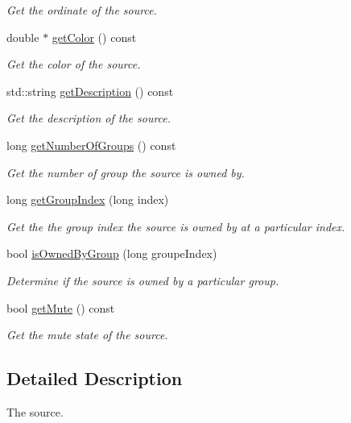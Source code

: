 \begin{DoxyCompactItemize}
\begin{DoxyCompactList}\small\item\em Get the ordinate of the source. \end{DoxyCompactList}\item 
double $\ast$ \hyperlink{class_hoa2_d_1_1_source_a4544d0ab2a4bc7c26e6b4597469321bf}{get\-Color} () const 
\begin{DoxyCompactList}\small\item\em Get the color of the source. \end{DoxyCompactList}\item 
std\-::string \hyperlink{class_hoa2_d_1_1_source_a96021e2cf9fc4077f822bb68fb4d9283}{get\-Description} () const 
\begin{DoxyCompactList}\small\item\em Get the description of the source. \end{DoxyCompactList}\item 
long \hyperlink{class_hoa2_d_1_1_source_a24ebd335837005f381291d30b55e7a93}{get\-Number\-Of\-Groups} () const 
\begin{DoxyCompactList}\small\item\em Get the number of group the source is owned by. \end{DoxyCompactList}\item 
long \hyperlink{class_hoa2_d_1_1_source_a3aaa2f340a459a69500a1909ae23f3b5}{get\-Group\-Index} (long index)
\begin{DoxyCompactList}\small\item\em Get the the group index the source is owned by at a particular index. \end{DoxyCompactList}\item 
bool \hyperlink{class_hoa2_d_1_1_source_a19484de84a7b4d9a2178fc0894dd5249}{is\-Owned\-By\-Group} (long groupe\-Index)
\begin{DoxyCompactList}\small\item\em Determine if the source is owned by a particular group. \end{DoxyCompactList}\item 
bool \hyperlink{class_hoa2_d_1_1_source_addb6bdf4acf1f30fc50b255bdf0d73c4}{get\-Mute} () const 
\begin{DoxyCompactList}\small\item\em Get the mute state of the source. \end{DoxyCompactList}\end{DoxyCompactItemize}


\subsection{Detailed Description}
The source. 

